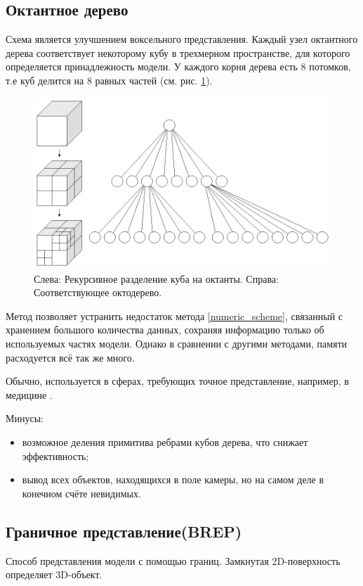 \subsection{Октантное дерево}
Схема является улучшением воксельного представления. Каждый узел октантного дерева соответствует некоторому кубу в трехмерном пространстве, для которого определяется принадлежность модели.
У каждого корня дерева есть 8 потомков, т.е куб делится на 8 равных частей (см. рис. \ref{fig:octree}).
\begin{figure}
  \centering
  \includegraphics[scale=0.4]{inc/img/octree}
  \caption{Слева: Рекурсивное разделение куба на октанты. Справа: Соответствующее октодерево.}
  \label{fig:octree}
\end{figure}

Метод позволяет устранить недостаток метода \ref{numeric_scheme}, связанный с хранением большого количества данных, сохраняя информацию только об используемых частях модели.
Однако в сравнении с другими методами, памяти расходуется всё так же много. 

Обычно, используется в сферах, требующих точное представление, например, в медицине \cite{octree}.

Минусы:  
\begin{itemize} 
\item возможное деления примитива ребрами кубов дерева, что снижает эффективность;
\item вывод всех объектов, находящихся в поле камеры, но на самом деле в конечном счёте невидимых.
\end{itemize}

\subsection{Граничное представление(BREP)}
Способ представления модели с помощью границ. Замкнутая 2D-поверхность определяет 3D-объект.

